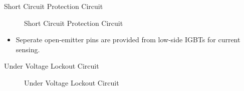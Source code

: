 
\begin{frame}{Short Circuit Protection Circuit}
	\begin{figure}
		\centering


		\caption{Short Circuit Protection Circuit}
	\end{figure}


	\begin{itemize}
		\item Seperate open-emitter pins are provided from low-side IGBTs for current sensing.
	\end{itemize}
\end{frame}




\begin{frame}{Under Voltage Lockout Circuit}
	\begin{figure}
		\centering


		\caption{Under Voltage Lockout Circuit}
	\end{figure}
\end{frame}


